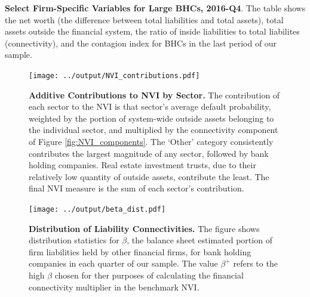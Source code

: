 \newpage

\begin{landscape}
\begin{table}[htbp]\centering
\def\sym#1{\ifmmode^{#1}\else\(^{#1}\)\fi}

\caption[]{\textbf{Select Firm-Specific Variables for Large BHCs, 2016-Q4}. The table shows the net worth (the difference between total liabilities and total assets), total assets outside the financial system, the ratio of inside liabilities to total liabilites (connectivity), and the contagion index for BHCs in the last period of our sample.}\label{tab:large_instit}
\end{table}
\end{landscape}
\newpage

\begin{figure}[h!]
\begin{center}
\texttt{[image: ../output/NVI\_contributions.pdf]}
\end{center}
\caption[]{\textbf{Additive Contributions to NVI by Sector.} The contribution of each sector to the NVI is that sector's average default probability, weighted by the portion of system-wide outside assets belonging to the individual sector, and multiplied by the connectivity component of Figure \ref{fig:NVI_components}. The `Other' category consistently contributes the largest magnitude of any sector, followed by bank holding companies. Real estate investment trusts, due to their relatively low quantity of outside assets, contribute the least. The final NVI measure is the sum of each sector's contribution.} \label{fig:NVI_contributions}
\end{figure}

\begin{figure}[h!]
\begin{center}
\texttt{[image: ../output/beta\_dist.pdf]}
\end{center}
\caption[]{\textbf{Distribution of Liability Connectivities.} The figure shows distribution statistics for $\beta$, the balance sheet estimated portion of firm liabilities held by other financial firms, for bank holding companies in each quarter of our sample. The value $\beta^+$ refers to the high $\beta$ chosen for ther purposes of calculating the financial connectivity multiplier in the benchmark NVI.} \label{fig:beta_dist}
\end{figure}